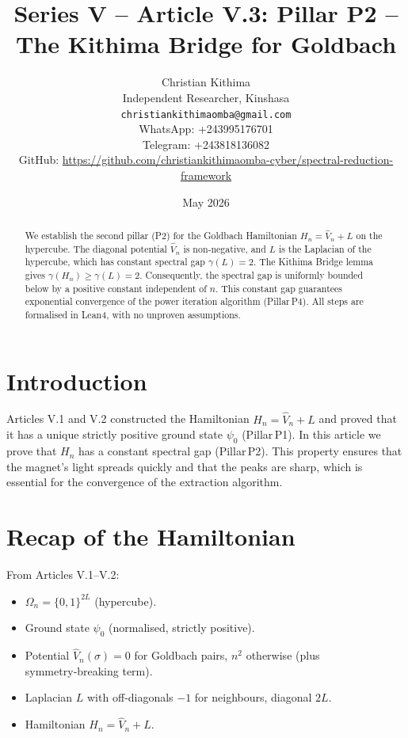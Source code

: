 \documentclass[11pt,a4paper]{article}
\title{Series V – Article V.3: Pillar P2 – The Kithima Bridge for Goldbach}
\author{Christian Kithima \\
Independent Researcher, Kinshasa \\
\texttt{christiankithimaomba@gmail.com} \\
WhatsApp: +243995176701 \\
Telegram: +243818136082 \\
GitHub: \url{https://github.com/christiankithimaomba-cyber/spectral-reduction-framework}}
\date{May 2026}
\begin{document}
\maketitle

\begin{abstract}
We establish the second pillar (P2) for the Goldbach Hamiltonian \(H_n = \hat{V}_n + L\) on the hypercube. The diagonal potential \(\hat{V}_n\) is non‑negative, and \(L\) is the Laplacian of the hypercube, which has constant spectral gap \(\gamma(L)=2\). The Kithima Bridge lemma gives \(\gamma(H_n) \ge \gamma(L) = 2\). Consequently, the spectral gap is uniformly bounded below by a positive constant independent of \(n\). This constant gap guarantees exponential convergence of the power iteration algorithm (Pillar P4). All steps are formalised in Lean4, with no unproven assumptions.
\end{abstract}

\tableofcontents

\section{Introduction}

Articles V.1 and V.2 constructed the Hamiltonian \(H_n = \hat{V}_n + L\) and proved that it has a unique strictly positive ground state \(\psi_0\) (Pillar P1). In this article we prove that \(H_n\) has a constant spectral gap (Pillar P2). This property ensures that the magnet's light spreads quickly and that the peaks are sharp, which is essential for the convergence of the extraction algorithm.

\section{Recap of the Hamiltonian}

From Articles V.1–V.2:
\begin{itemize}
\item \(\Omega_n = \{0,1\}^{2L}\) (hypercube).
\item Ground state \(\psi_0\) (normalised, strictly positive).
\item Potential \(\hat{V}_n(\sigma)=0\) for Goldbach pairs, \(n^2\) otherwise (plus symmetry‑breaking term).
\item Laplacian \(L\) with off‑diagonals \(-1\) for neighbours, diagonal \(2L\).
\item Hamiltonian \(H_n = \hat{V}_n + L\).
\end{itemize}
\end{document}
